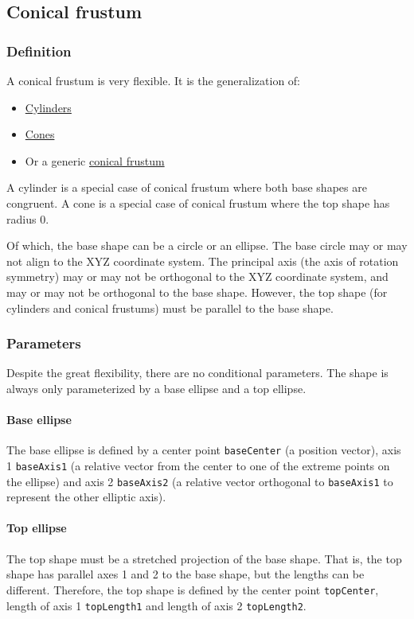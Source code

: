 \documentclass{report}
\begin{document}
			\subsection{Conical frustum}
				\subsubsection{Definition} A conical frustum is very flexible. It is the generalization of:
					\begin{itemize}
						\item \href{http://mathworld.wolfram.com/Cylinder.html}{Cylinders}
						\item \href{http://mathworld.wolfram.com/Cone.html}{Cones}
						\item Or a generic \href{http://mathworld.wolfram.com/ConicalFrustum.html}{conical frustum}
					\end{itemize}

					A cylinder is a special case of conical frustum where both base shapes are congruent. A cone is a
					special case of conical frustum where the top shape has radius 0.

					Of which, the base shape can be a circle or an ellipse. The base circle may or may not align to the
					XYZ coordinate system. The principal axis (the axis of rotation symmetry) may or may not be
					orthogonal to the XYZ coordinate system, and may or may not be orthogonal to the base shape.
					However, the top shape (for cylinders and conical frustums) must be parallel to the base shape.
				\subsubsection{Parameters} Despite the great flexibility, there are no conditional parameters. The shape
				is always only parameterized by a base ellipse and a top ellipse.
					\paragraph{Base ellipse} The base ellipse is defined by a center point \texttt{baseCenter} (a
					position vector), axis 1 \texttt{baseAxis1} (a relative vector from the center to one of the
					extreme points on the ellipse) and axis 2 \texttt{baseAxis2} (a relative vector orthogonal to
					\texttt{baseAxis1} to represent the other elliptic axis).
					\paragraph{Top ellipse} The top shape must be a stretched projection of the base shape. That is,
					the top shape has parallel axes 1 and 2 to the base shape, but the lengths can be different.
					Therefore, the top shape is defined by the center point \texttt{topCenter}, length of axis 1
					\texttt{topLength1} and length of axis 2 \texttt{topLength2}.
\end{document}
